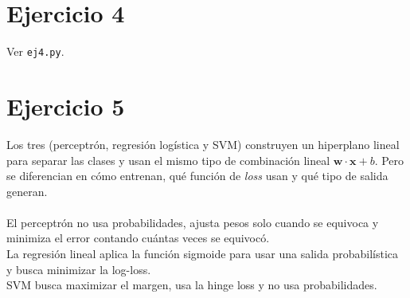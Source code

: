 \documentclass{article}
\begin{document}
    \section*{Ejercicio 4}
        Ver \texttt{ej4.py}.
    \section*{Ejercicio 5}
       \noindent Los tres (perceptrón, regresión logística y SVM) construyen un hiperplano lineal para separar las clases y usan el mismo tipo de combinación lineal $\mathbf{w} \cdot \mathbf{x} + b$. Pero se diferencian en cómo entrenan, qué función de \textit{loss} usan y qué tipo de salida generan. \\
       \\
       El perceptrón no usa probabilidades, ajusta pesos solo cuando se equivoca y minimiza el error contando cuántas veces se equivocó. \\
       La regresión lineal aplica la función sigmoide para usar una salida probabilística y busca minimizar la log-loss. \\
       SVM busca maximizar el margen, usa la hinge loss y no usa probabilidades.
\end{document}
